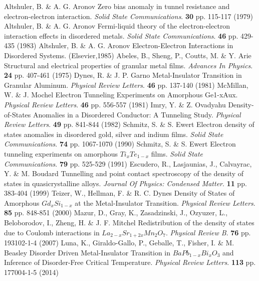 
  \begin{thebibliography}{99}
Altshuler, B. \& A. G. Aronov Zero bias anomaly in tunnel resistance and electron-electron interaction. {\em Solid State Communications}. \textbf{30} pp. 115-117 (1979)
Altshuler, B. \& A. G. Aronov Fermi-liquid theory of the electron-electron interaction effects in disordered metals. {\em Solid State Communications}. \textbf{46} pp. 429-435 (1983)
Altshuler, B. \& A. G. Aronov Electron-Electron Interactions in Disordered Systems. (Elsevier,1985)
Abeles, B., Sheng, P., Coutts, M. \& Y. Arie Structural and electrical properties of granular metal films. {\em Advances In Physics}. \textbf{24} pp. 407-461 (1975)
Dynes, R. \& J. P. Garno Metal-Insulator Transition in Granular Aluminum. {\em Physical Review Letters}. \textbf{46} pp. 137-140 (1981)
McMillan, W. \& J. Mochel Electron Tunneling Experiments on Amorphous Ge1-xAux. {\em Physical Review Letters}. \textbf{46} pp. 556-557 (1981)
Imry, Y. \& Z. Ovadyahu Density-of-States Anomalies in a Disordered Conductor: A Tunneling Study. {\em Physical Review Letters}. \textbf{49} pp. 841-844 (1982)
Schmitz, S. \& S. Ewert Electron density of states anomalies in disordered gold, silver and indium films. {\em Solid State Communications}. \textbf{74} pp. 1067-1070 (1990)
Schmitz, S. \& S. Ewert Electron tunneling experiments on amorphous $Ti_xTe_{1-x}$ films. {\em Solid State Communications}. \textbf{79} pp. 525-529 (1991)
Escudero, R., Lasjaunias, J., Calvayrac, Y. \& M. Boudard Tunnelling and point contact spectroscopy of the density of states in quasicrystalline alloys. {\em Journal Of Physics: Condensed Matter}. \textbf{11} pp. 383-404 (1999)
Teizer, W., Hellman, F. \& R. C. Dynes Density of States of Amorphous $Gd_xSi_{1-x}$ at the Metal-Insulator Transition. {\em Physical Review Letters}. \textbf{85} pp. 848-851 (2000)
Mazur, D., Gray, K., Zasadzinski, J., Ozyuzer, L., Beloborodov, I., Zheng, H. \& J. F. Mitchel Redistribution of the density of states due to Coulomb interactions in $La_{2-x}Sr_{1+2x}Mn_2O_7$. {\em Physical Review B}. \textbf{76} pp. 193102-1-4 (2007)
Luna, K., Giraldo-Gallo, P., Geballe, T., Fisher, I. \& M. Beasley Disorder Driven Metal-Insulator Transition in $BaPb_{1-x}Bi_xO_3$ and Inference of Disorder-Free Critical Temperature. {\em Physical Review Letters}. \textbf{113} pp. 177004-1-5 (2014)

\end{thebibliography}
